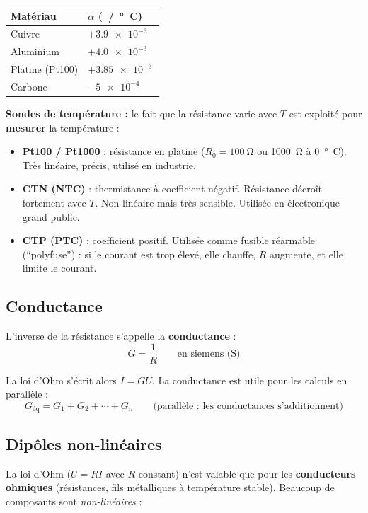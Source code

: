 \documentclass[12pt,a4paper,twoside]{book}
\begin{document}
\begin{center}
\begin{tabular}{ll}
\toprule
\textbf{Matériau} & $\alpha$ (\SI{}{/°C}) \\
\midrule
Cuivre & $+\SI{3.9e-3}{}$ \\
Aluminium & $+\SI{4.0e-3}{}$ \\
Platine (Pt100) & $+\SI{3.85e-3}{}$ \\
Carbone & $-\SI{5e-4}{}$ \\
\bottomrule
\end{tabular}
\end{center}

\begin{pratique}
\textbf{Sondes de température :} le fait que la résistance varie avec $T$ est exploité pour \textbf{mesurer} la température :
\begin{itemize}[nosep]
\item \textbf{Pt100 / Pt1000} : résistance en platine ($R_0 = \SI{100}{\ohm}$ ou \SI{1000}{\ohm} à \SI{0}{°C}). Très linéaire, précis, utilisé en industrie.
\item \textbf{CTN (NTC)} : thermistance à coefficient négatif. Résistance décroît fortement avec $T$. Non linéaire mais très sensible. Utilisée en électronique grand public.
\item \textbf{CTP (PTC)} : coefficient positif. Utilisée comme fusible réarmable (``polyfuse'') : si le courant est trop élevé, elle chauffe, $R$ augmente, et elle limite le courant.
\end{itemize}
\end{pratique}

\subsection{Conductance}

L'inverse de la résistance s'appelle la \textbf{conductance} :
\[
G = \frac{1}{R} \qquad \text{en siemens (S)}
\]

La loi d'Ohm s'écrit alors $I = GU$. La conductance est utile pour les calculs en parallèle :
\[
G_{\text{éq}} = G_1 + G_2 + \cdots + G_n \qquad \text{(parallèle : les conductances s'additionnent)}
\]

\subsection{Dipôles non-linéaires}

La loi d'Ohm ($U = RI$ avec $R$ constant) n'est valable que pour les \textbf{conducteurs ohmiques} (résistances, fils métalliques à température stable). Beaucoup de composants sont \textit{non-linéaires} :
\end{document}
